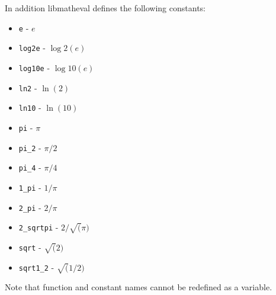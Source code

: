 \documentclass[noshowpacs,preprintnumbers,amsmath,amssymb, letter]{revtex4}
\begin{document}
In addition libmatheval defines the following constants:
\begin{itemize}
\item{} \texttt{e} - $e$
\item{} \texttt{log2e} - $\log2(e)$
\item{} \texttt{log10e} - $\log10(e)$
\item{} \texttt{ln2} - $\ln(2)$
\item{} \texttt{ln10} - $\ln(10)$
\item{} \texttt{pi} - $\pi$
\item{} \texttt{pi\_2} - $\pi / 2$
\item{} \texttt{pi\_4} - $\pi / 4$
\item{} \texttt{1\_pi} - $1 / \pi$
\item{} \texttt{2\_pi} - $2 / \pi$
\item{} \texttt{2\_sqrtpi} - $2 / \sqrt(\pi)$
\item{} \texttt{sqrt} - $\sqrt(2)$
\item{} \texttt{sqrt1\_2} - $\sqrt(1 / 2)$
\end{itemize}

Note that function and constant names cannot be redefined as a variable. 
\end{document}
